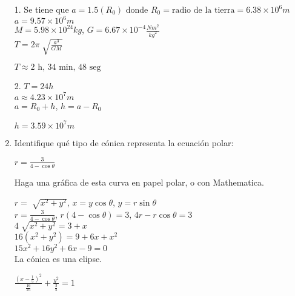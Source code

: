 \documentclass[10pt, a4paper]{article}
\begin{document}
\begin{enumerate}
        \begin{center}
                1. Se tiene que $a=1.5(R_0)$ donde $R_0=\text{radio de la tierra}=6.38\times 10^6 \si{m}$\\
                $a=9.57\times 10^6\si{m}$\\
                $M=5.98\times 10^{24}\si{kg}$, $\si{G}=6.67\times 10^{-4} \frac{\si{N}\si{m}^2}{\si{kg}^2}$\\
                $T=2\pi\sqrt[]{\frac{a^3}{\si{G}M}}$

                $T\approx \text{2 h, 34 min, 48 seg}$

                2. $T=24\si{h}$\\
                $a\approx 4.23\times 10^7 \si{m}$\\
                $a=R_0 + h$, $h= a-R_0$

                $h=3.59\times 10^7 \si{m}$
        \end{center}
        
        \item Identifique qué tipo de cónica representa la ecuación polar:
        \begin{center}
            $r=\frac{3}{4-\cos\theta}$
        \end{center}
        Haga una gráfica de esta curva en papel polar, o con Mathematica.

        \begin{center}
            $r=\sqrt[]{x^2+y^2}$, $x=y\cos\theta$, $y=r\sin\theta$\\
            $r=\frac{3}{4-\cos\theta}$, $r(4-\cos\theta)=3$, $4r-r\cos\theta=3$\\
            $4\sqrt[]{x^2+y^2}=3+x$\\
            $16(x^2+y^2)=9+6x+x^2$\\
            $15x^2+16y^2+6x-9=0$\\

            La cónica es una elipse.

            $\frac{(x-\frac{1}{5})^2}{\frac{16}{25}}+\frac{y^2}{\frac{3}{5}}=1$

        \end{center}


\end{enumerate}
\end{document}
